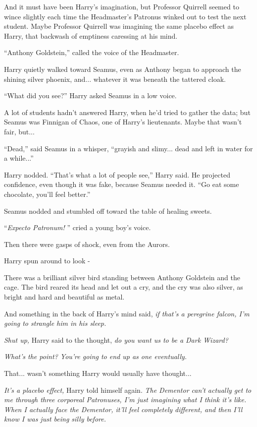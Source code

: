 And it must have been Harry's imagination, but Professor Quirrell seemed
to wince slightly each time the Headmaster's Patronus winked out to test
the next student. Maybe Professor Quirrell was imagining the same
placebo effect as Harry, that backwash of emptiness caressing at his
mind.

``Anthony Goldstein,'' called the voice of the Headmaster.

Harry quietly walked toward Seamus, even as Anthony began to approach
the shining silver phoenix, and... whatever it was beneath the
tattered cloak.

``What did you see?'' Harry asked Seamus in a low voice.

A lot of students hadn't answered Harry, when he'd tried to gather the
data; but Seamus was Finnigan of Chaos, one of Harry's lieutenants.
Maybe that wasn't fair, but...

``Dead,'' said Seamus in a whisper, ``grayish and slimy... dead and
left in water for a while...''

Harry nodded. ``That's what a lot of people see,'' Harry said. He
projected confidence, even though it was fake, because Seamus needed it.
``Go eat some chocolate, you'll feel better.''

Seamus nodded and stumbled off toward the table of healing sweets.

``\emph{Expecto Patronum!} '' cried a young boy's voice.

Then there were gasps of shock, even from the Aurors.

Harry spun around to look -

There was a brilliant silver bird standing between Anthony Goldstein and
the cage. The bird reared its head and let out a cry, and the cry was
also silver, as bright and hard and beautiful as metal.

And something in the back of Harry's mind said, \emph{if that's a
peregrine falcon, I'm going to strangle him in his sleep.}

\emph{Shut up,} Harry said to the thought, \emph{do you want us to be a
Dark Wizard?}

\emph{What's the point? You're going to end up as one eventually.}

That... wasn't something Harry would usually have thought...

\emph{It's a placebo effect,} Harry told himself again. \emph{The
Dementor can't actually get to me through three corporeal Patronuses,
I'm just imagining what I think it's like. When I actually face the
Dementor, it'll feel completely different, and then I'll know I was just
being silly before.}

